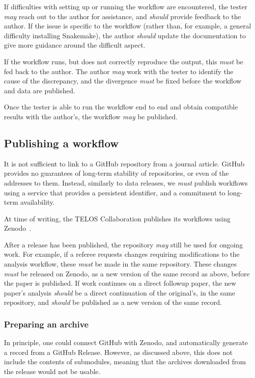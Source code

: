 \documentclass{article}
\newcommand\rfcword[1]{\emph{#1}\xspace}
\newcommand\must{\rfcword{must}}
\newcommand\should{\rfcword{should}}
\newcommand\may{\rfcword{may}}
\begin{document}
If difficulties with setting up or running the workflow are encountered,
the tester \may reach out to the author for assistance,
and \should provide feedback to the author.
If the issue is specific to the workflow
(rather than,
for example,
a general difficulty installing Snakemake),
the author \should update the documentation to give more guidance around the difficult aspect.

If the workflow runs,
but does not correctly reproduce the output,
this \must be fed back to the author.
The author \may work with the tester to identify the cause of the discrepancy,
and the divergence \must be fixed before the workflow and data are published.

Once the tester is able to run the workflow end to end
and obtain compatible results with the author's,
the workflow \may be published.

\subsection{Publishing a workflow}

It is not sufficient to link to a GitHub repository from a journal article.
GitHub provides no guarantees of long-term stability of repositories,
or even of the addresses to them.
Instead,
similarly to data releases,
we \must publish workflows using a service that provides a persistent identifier,
and a commitment to long-term availability.

At time of writing,
the TELOS Collaboration publishes its workflows using Zenodo~\cite{zenodo}.

After a release has been published,
the repository \may still be used for ongoing work.
For example,
if a referee requests changes requiring modifications to the analysis workflow,
these \must be made in the same repository.
These changes \must be released on Zenodo,
as a new version of the same record as above,
before the paper is published.
If work continues on a direct followup paper,
the new paper's analysis \should be a direct continuation of the original's,
in the same repository,
and \should be published as a new version of the same record.

\subsubsection{Preparing an archive}

In principle,
one could connect GitHub with Zenodo,
and automatically generate a record from a GitHub Release.
However,
as discussed above,
this does not include the contents of submodules,
meaning that the archives downloaded from the release would not be usable.
\end{document}
